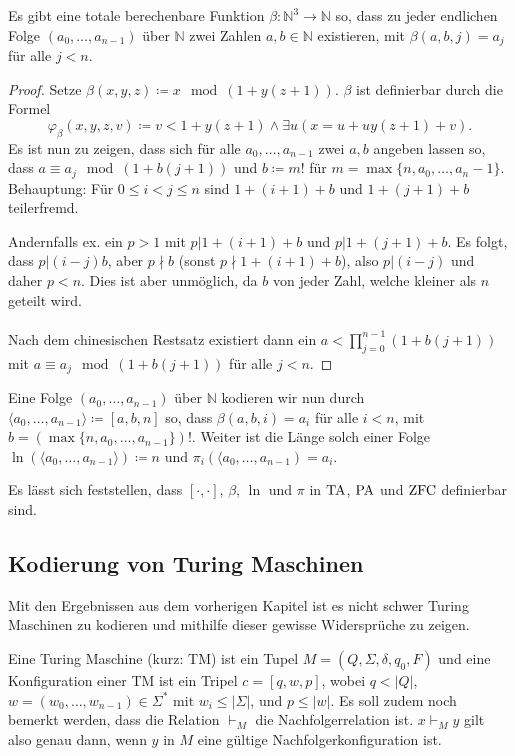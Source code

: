 \begin{lemma}
	Es gibt eine totale berechenbare Funktion $\beta:\mathbb{N}^3\to \mathbb{N}$ so, dass zu jeder endlichen Folge $(a_0,\dots,a_{n-1})$ über $\mathbb{N}$ zwei Zahlen $a,b\in\mathbb{N}$ existieren, mit $\beta(a,b,j)=a_j$ für alle $j<n$.
\end{lemma}
\begin{proof}
	Setze $\beta(x,y,z)\coloneqq x \mod (1+y(z+1))$. $\beta$ ist definierbar durch die Formel $$\varphi_\beta(x,y,z,v)\coloneqq v <1+y(z+1) \land \exists u (x=u+uy(z+1)+v).$$
	Es ist nun zu zeigen, dass sich für alle $a_0,\dots,a_{n-1}$ zwei $a,b$ angeben lassen so, dass $a\equiv a_j\mod (1+b(j+1))$ und $b\coloneqq m!$ für $m=\max\{n,a_0,\dots,a_n-1\}$.
	\\
	Behauptung: Für $0\leq i < j \leq n$ sind $1+(i+1)+b$ und $1+(j+1)+b$ teilerfremd.
	
	Andernfalls ex. ein $p>1$ mit $p \vert 1+(i+1)+b$ und $p\vert 1+(j+1)+b$.
	Es folgt, dass $p\vert (i-j)b$, aber $p\nmid b$ (sonst $p\nmid 1+(i+1)+b$), also $p\vert(i-j)$ und daher $p<n$. Dies ist aber unmöglich, da $b$ von jeder Zahl, welche kleiner als $n$ geteilt wird.
	\\ \\
	Nach dem chinesischen Restsatz existiert dann ein $a<\prod^{n-1}_{j=0}(1+b(j+1))$ mit $a\equiv a_j\mod (1+b(j+1))$ für alle $j<n$.
\end{proof}

Eine Folge $(a_0,\dots,a_{n-1})$ über $\mathbb{N}$ kodieren wir nun durch $\langle a_0,\dots,a_{n-1}\rangle\coloneqq[a,b,n]$ so, dass $\beta(a,b,i)=a_i$ für alle $i<n$, mit $b=(\max\{n,a_0,\dots,a_{n-1}\})!$. Weiter ist die Länge solch einer Folge $\ln(\langle a_0,\dots, a_{n-1}\rangle)\coloneqq n$ und $\pi_i(\langle a_0,\dots, a_{n-1})=a_i$.

Es lässt sich feststellen, dass $[\cdot,\cdot]$, $\beta$, $\ln$ und $\pi$ in $\operatorname{TA}$, $\operatorname{PA}$ und $\operatorname{ZFC}$ definierbar sind.


\subsection{Kodierung von Turing Maschinen}

Mit den Ergebnissen aus dem vorherigen Kapitel ist es nicht schwer Turing Maschinen zu kodieren und mithilfe dieser gewisse Widersprüche zu zeigen.

Eine Turing Maschine (kurz: TM) ist ein Tupel $M=(Q,\Sigma, \delta, q_0, F)$ und eine Konfiguration einer TM ist ein Tripel $c=[q,w,p]$, wobei $q<\vert Q\vert$, $w=(w_0,\dots,w_{n-1})\in \Sigma^\ast \text{ mit } w_i\leq \vert \Sigma\vert$, und $p\leq \vert w \vert$. Es soll zudem noch bemerkt werden, dass die Relation $\vdash_M$ die Nachfolgerrelation ist. $x\vdash_M y$ gilt also genau dann, wenn $y$ in $M$ eine gültige Nachfolgerkonfiguration ist.

